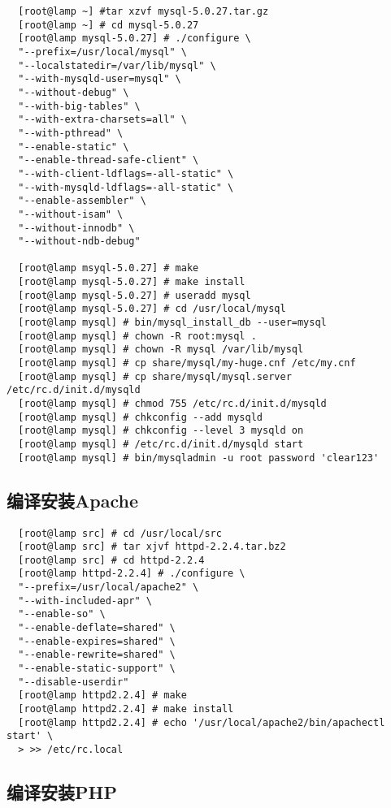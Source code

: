 \small{
\begin{verbatim}
  [root@lamp ~] #tar xzvf mysql-5.0.27.tar.gz
  [root@lamp ~] # cd mysql-5.0.27
  [root@lamp mysql-5.0.27] # ./configure \
  "--prefix=/usr/local/mysql" \
  "--localstatedir=/var/lib/mysql" \
  "--with-mysqld-user=mysql" \
  "--without-debug" \
  "--with-big-tables" \
  "--with-extra-charsets=all" \
  "--with-pthread" \
  "--enable-static" \
  "--enable-thread-safe-client" \
  "--with-client-ldflags=-all-static" \
  "--with-mysqld-ldflags=-all-static" \
  "--enable-assembler" \
  "--without-isam" \
  "--without-innodb" \
  "--without-ndb-debug"
  
  [root@lamp msyql-5.0.27] # make
  [root@lamp mysql-5.0.27] # make install
  [root@lamp mysql-5.0.27] # useradd mysql
  [root@lamp mysql-5.0.27] # cd /usr/local/mysql
  [root@lamp mysql] # bin/mysql_install_db --user=mysql
  [root@lamp mysql] # chown -R root:mysql .
  [root@lamp mysql] # chown -R mysql /var/lib/mysql
  [root@lamp mysql] # cp share/mysql/my-huge.cnf /etc/my.cnf
  [root@lamp mysql] # cp share/mysql/mysql.server /etc/rc.d/init.d/mysqld
  [root@lamp mysql] # chmod 755 /etc/rc.d/init.d/mysqld
  [root@lamp mysql] # chkconfig --add mysqld
  [root@lamp mysql] # chkconfig --level 3 mysqld on
  [root@lamp mysql] # /etc/rc.d/init.d/mysqld start
  [root@lamp mysql] # bin/mysqladmin -u root password 'clear123'
\end{verbatim}
}
\normalsize

\subsection{编译安装Apache}

\small{
\begin{verbatim}
  [root@lamp src] # cd /usr/local/src
  [root@lamp src] # tar xjvf httpd-2.2.4.tar.bz2
  [root@lamp src] # cd httpd-2.2.4
  [root@lamp httpd-2.2.4] # ./configure \
  "--prefix=/usr/local/apache2" \
  "--with-included-apr" \
  "--enable-so" \
  "--enable-deflate=shared" \
  "--enable-expires=shared" \
  "--enable-rewrite=shared" \
  "--enable-static-support" \
  "--disable-userdir"
  [root@lamp httpd2.2.4] # make
  [root@lamp httpd2.2.4] # make install
  [root@lamp httpd2.2.4] # echo '/usr/local/apache2/bin/apachectl start' \
  > >> /etc/rc.local
\end{verbatim}
}
\normalsize

\subsection{编译安装PHP}

